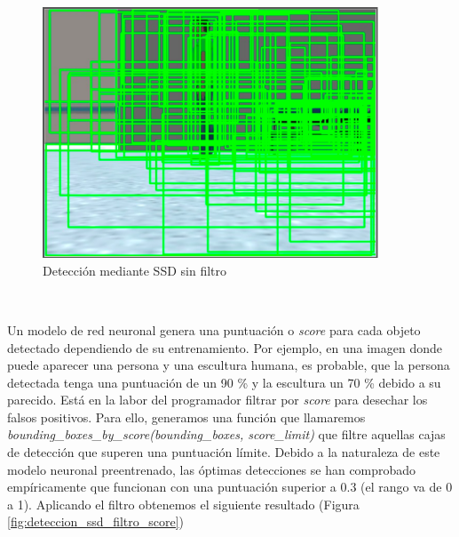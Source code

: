 \begin{figure} [H]
  \begin{center}
    \includegraphics[width=10cm]{imagenes/cap6/deteccion-ssd-sin-filtro.png}
  \end{center}
  \caption[Detección mediante SSD sin filtro]{Detección mediante SSD sin filtro}
  \label{fig:deteccion_ssd_sin_filtro}
\end{figure}\

Un modelo de red neuronal genera una puntuación o \textit{score} para cada objeto detectado dependiendo de su entrenamiento. Por ejemplo, en una imagen donde puede aparecer una persona y una escultura humana, es probable, que la persona detectada tenga una puntuación de un 90 \% y la escultura un 70 \% debido a su parecido. Está en la labor del programador filtrar por \textit{score} para desechar los falsos positivos. Para ello, generamos una función que llamaremos \textit{bounding\_boxes\_by\_score(bounding\_boxes, score\_limit)} que filtre aquellas cajas de detección que superen una puntuación límite. Debido a la naturaleza de este modelo neuronal preentrenado, las óptimas detecciones se han comprobado empíricamente que funcionan con una puntuación superior a 0.3 (el rango va de 0 a 1). Aplicando el filtro obtenemos el siguiente resultado (Figura \ref{fig:deteccion_ssd_filtro_score})\\

